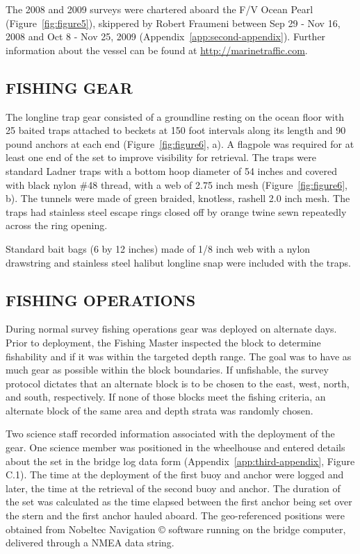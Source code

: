 \documentclass[12pt]{article}\usepackage[]{graphicx}\usepackage[]{color}
\begin{document}
The 2008 and 2009 surveys were chartered aboard the F/V Ocean Pearl (Figure~\ref{fig:figure5}), skippered by Robert Fraumeni between Sep 29 - Nov 16, 2008 and Oct 8 - Nov 25, 2009 (Appendix~\ref{app:second-appendix}). Further information about the vessel can be found at \href{http://marinetraffic.com}{\underline{http://marinetraffic.com}}.

\hypertarget{fishing-gear}{%
\subsection{FISHING GEAR}\label{fishing-gear}}

The longline trap gear consisted of a groundline resting on the ocean floor with 25 baited traps attached to beckets at 150 foot intervals along its length and 90 pound anchors at each end (Figure~\ref{fig:figure6}, a). A flagpole was required for at least one end of the set to improve visibility for retrieval. The traps were standard Ladner traps with a bottom hoop diameter of 54 inches and covered with black nylon \#48 thread, with a web of 2.75 inch mesh (Figure~\ref{fig:figure6}, b). The tunnels were made of green braided, knotless, rashell 2.0 inch mesh. The traps had stainless steel escape rings closed off by orange twine sewn repeatedly across the ring opening.

Standard bait bags (6 by 12 inches) made of 1/8 inch web with a nylon drawstring and stainless steel halibut longline snap were included with the traps.

\hypertarget{fishing-operations}{%
\subsection{FISHING OPERATIONS}\label{fishing-operations}}

During normal survey fishing operations gear was deployed on alternate days. Prior to deployment, the Fishing Master inspected the block to determine fishability and if it was within the targeted depth range. The goal was to have as much gear as possible within the block boundaries. If unfishable, the survey protocol dictates that an alternate block is to be chosen to the east, west, north, and south, respectively. If none of those blocks meet the fishing criteria, an alternate block of the same area and depth strata was randomly chosen.

Two science staff recorded information associated with the deployment of the gear. One science member was positioned in the wheelhouse and entered details about the set in the bridge log data form (Appendix~\ref{app:third-appendix}, Figure C.1). The time at the deployment of the first buoy and anchor were logged and later, the time at the retrieval of the second buoy and anchor. The duration of the set was calculated as the time elapsed between the first anchor being set over the stern and the first anchor hauled aboard. The geo-referenced positions were obtained from Nobeltec Navigation © software running on the bridge computer, delivered through a NMEA data string.
\end{document}
